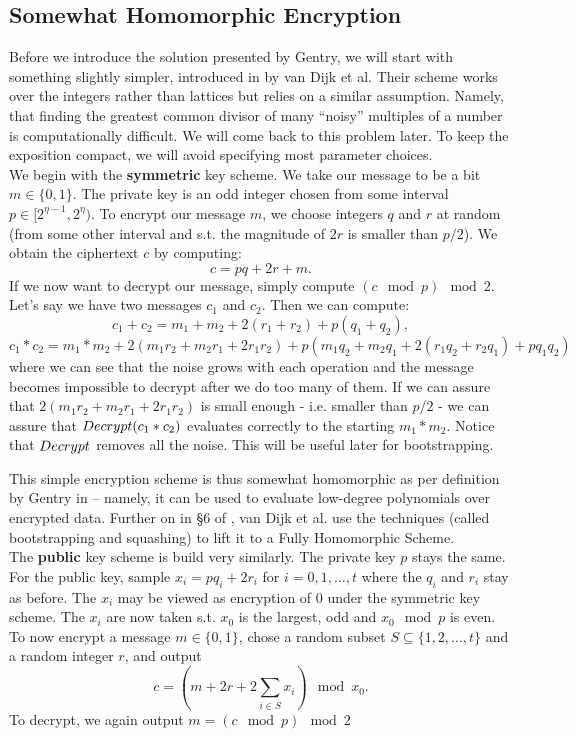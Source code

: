 \subsection{Somewhat Homomorphic Encryption}
Before we introduce the solution presented by Gentry, we will start with something slightly simpler, introduced in \cite{int_scheme} by van Dijk et al. Their scheme works over the integers rather than lattices but relies on a similar assumption. Namely, that finding the greatest common divisor of many “noisy” multiples of a number is computationally difficult. We will come back to this problem later. To keep the exposition compact, we will avoid specifying most parameter choices. \\

We begin with the \textbf{symmetric} key scheme. We take our message to be a bit $m \in \{0,1\}$. The private key is an odd integer chosen from some interval $p \in [2^{\eta - 1}, 2^{\eta})$. To encrypt our message $m$, we choose integers $q$ and $r$ at random (from some other interval and s.t. the magnitude of $2r$ is smaller than $p/2$). We obtain the ciphertext $c$ by computing: 
$$c = pq + 2r + m.$$
If we now want to decrypt our message, simply compute $(c \mod p) \mod 2$. \\
Let's say we have two messages $c_1$ and $c_2$. Then we can compute:
$$ c_1 + c_2 = m_1 + m_2 + 2(r_1 + r_2) + p(q_1 + q_2),$$
$$ c_1 * c_2 = m_1 * m_2 + 2(m_1r_2 + m_2r_1 + 2r_1r_2) + p(m_1q_2 + m_2q_1 + 2(r_1q_2 + r_2q_1) + pq_1q_2)$$
where we can see that the noise grows with each operation and the message becomes impossible to decrypt after we do too many of them. If we can assure that $2(m_1r_2 + m_2r_1 + 2r_1r_2)$ is small enough - i.e. smaller than $p/2$ - we can assure that $Decrypt(c_1 * c_2)$ evaluates correctly to the starting $m_1 * m_2$. Notice that $Decrypt$ removes all the noise. This will be useful later for bootstrapping.

This simple encryption scheme is thus somewhat homomorphic as per definition by Gentry in \cite{gentry_phd} – namely, it can be used to evaluate low-degree polynomials over encrypted data. Further on in \S 6 of \cite{int_scheme}, van Dijk et al. use the techniques (called bootstrapping and squashing) to lift it to a Fully Homomorphic Scheme. \\

The \textbf{public} key scheme is build very similarly. The private key $p$ stays the same. For the public key, sample $x_i = p q_i + 2r_i$ for $i = 0, 1, \dots, t$ where the $q_i$ and $r_i$ stay as before. The $x_i$ may be viewed as encryption of 0 under the symmetric key scheme. The $x_i$ are now taken s.t. $x_0$ is the largest, odd and $x_0 \mod p$ is even. To now encrypt a message $m \in \{0,1\}$, chose a random subset $S \subseteq \{1, 2, \dots, t\}$ and a random integer $r$, and output
$$ c = (m + 2r + 2\sum_{i \in S} x_i) \mod x_0. $$
To decrypt, we again output $m = (c \mod p) \mod 2$ \\

